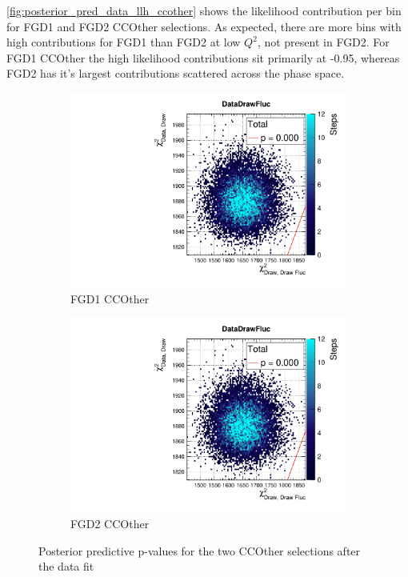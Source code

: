 \autoref{fig:posterior_pred_data_llh_ccother} shows the likelihood contribution per bin for FGD1 and FGD2 CCOther selections. As expected, there are more bins with high contributions for FGD1 than FGD2 at low $Q^2$, not present in FGD2. For FGD1 CCOther the high likelihood contributions sit primarily at -0.95, whereas FGD2 has it's largest contributions scattered across the phase space.
\begin{figure}[h]
	\begin{subfigure}[t]{0.49\textwidth}
		\includegraphics[width=\textwidth, trim={0mm 6mm 0mm 11mm}, clip,page=21]{figures/mach3/data/postpred/2017b_NewData_NewDet_UpdXsecStep_2Xsec_4Det_5Flux_0_PostPred_procs}
		\caption{FGD1 CCOther}
	\end{subfigure}
	\begin{subfigure}[t]{0.49\textwidth}
		\includegraphics[width=\textwidth, trim={0mm 6mm 0mm 11mm}, clip,page=48]{figures/mach3/data/postpred/2017b_NewData_NewDet_UpdXsecStep_2Xsec_4Det_5Flux_0_PostPred_procs}
		\caption{FGD2 CCOther}
	\end{subfigure}
\caption{Posterior predictive p-values for the two CCOther selections after the data fit}
\label{fig:posterior_pred_data_llh_ccother}
\end{figure}

